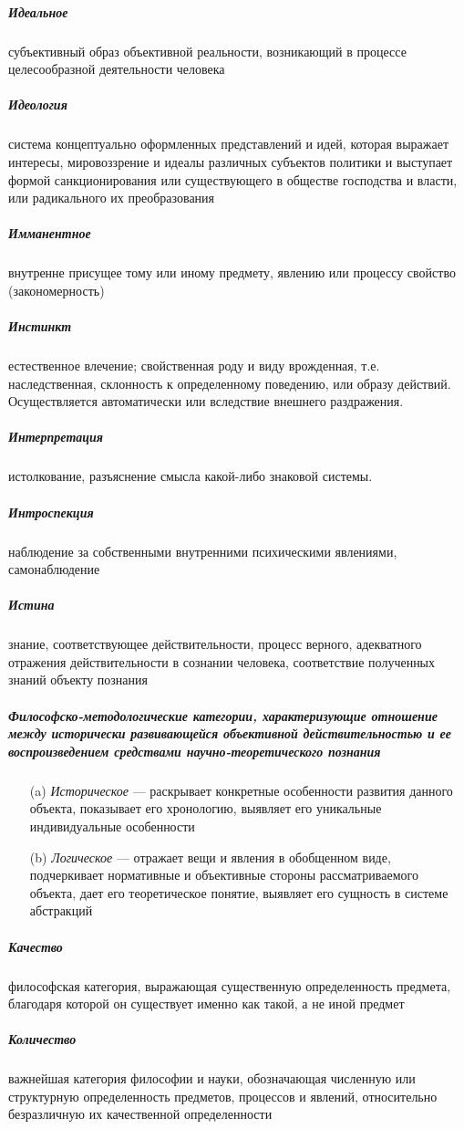 \documentclass[a4paper, 12pt]{article}
\theoremstyle{plain} %
\theoremstyle{definition} %
\theoremstyle{remark} %
\begin{document}
\subparagraph{Идеальное}
	субъективный образ объективной реальности, возникающий в процессе целесообразной деятельности человека

\subparagraph{Идеология}
	система концептуально оформленных представлений и идей, которая выражает интересы, мировоззрение и идеалы различных субъектов политики и выступает формой санкционирования или существующего в обществе господства и власти, или радикального их преобразования

\subparagraph{Имманентное}
	внутренне присущее тому или иному предмету, явлению или процессу свойство (закономерность)

\subparagraph{Инстинкт}
	естественное влечение; свойственная роду и виду врожденная, т.е. наследственная, склонность к определенному поведению, или образу действий. Осуществляется автоматически или вследствие внешнего раздражения.

\subparagraph{Интерпретация}
	 истолкование, разъяснение смысла какой-либо знаковой системы.

\subparagraph{Интроспекция}
	наблюдение за собственными внутренними психическими явлениями, самонаблюдение

\subparagraph{Истина}
	знание, соответствующее действительности, процесс верного, адекватного отражения действительности в сознании человека, соответствие полученных знаний объекту познания

\subparagraph{Философско-методологические категории, характеризующие отношение между исторически развивающейся объективной действительностью и ее воспроизведением средствами научно-теоретического познания}
\begin{itemize}
	\item[(a)] \emph{Историческое} --- раскрывает конкретные особенности развития данного объекта, показывает его хронологию, выявляет его уникальные индивидуальные особенности
	\item[(b)] \emph{Логическое} --- отражает вещи и явления в обобщенном виде, подчеркивает нормативные и объективные стороны рассматриваемого объекта, дает его теоретическое понятие, выявляет его сущность в системе абстракций
\end{itemize}

\subparagraph{Качество}
	философская категория, выражающая существенную определенность предмета, благодаря которой он существует именно как такой, а не иной предмет

\subparagraph{Количество}
	важнейшая категория философии и науки, обозначающая численную или структурную определенность предметов, процессов и явлений, относительно безразличную их качественной определенности
\end{document}
